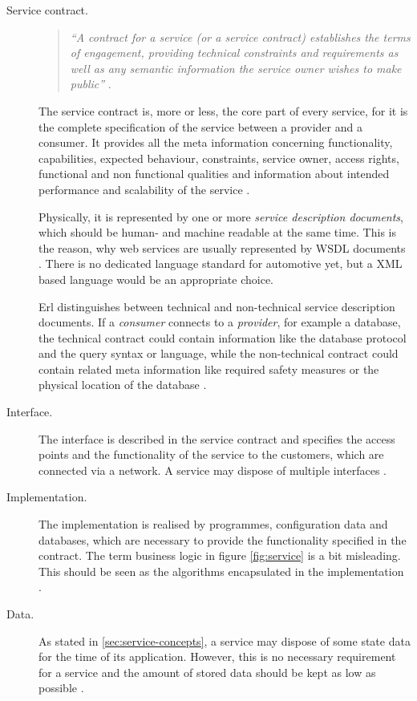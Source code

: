 \begin{description}
\item [Service contract.] 
\begin{quote}
\emph{``A contract for a service (or a service contract) establishes the terms of engagement, providing technical constraints and requirements as well as any semantic information the service owner wishes to make public''} 
\cite[ch.6.1]{erl2008}.
\end{quote}
The service contract is, more or less, the core part of every service, for it is the complete specification of the service between a provider and a consumer. It provides all the meta information concerning functionality, capabilities, expected behaviour, constraints, service owner, access rights, functional and non functional qualities and information about intended performance and scalability of the service \cite[p.44]{krafzig} \cite[p.26]{josuttis} \cite{breivold}.

Physically, it is represented by one or more \emph{service description documents}, which should be human- and machine readable at the same time. This is the reason, why web services are usually represented by WSDL documents \cite[p.43]{erl2011}. There is no dedicated language standard for automotive yet, but a XML based language would be an appropriate choice.

Erl \cite{erl2008} distinguishes between technical and non-technical service description documents. If a \emph{consumer} connects to a \emph{provider}, for example a database, the technical contract could contain information like the database protocol and the query syntax or language, while the non-technical contract could contain related meta information like required safety measures or the physical location of the database \cite[ch.6.1]{erl2008}.

\item [Interface.] 
The interface is described in the service contract and specifies the access points and the functionality of the service to the customers, which are connected via a network. A service may dispose of multiple interfaces \cite[p.44]{krafzig} \cite{breivold}.

\item [Implementation.] 
The implementation is realised by programmes, configuration data and databases, which are necessary to provide the functionality specified in the contract. The term business logic in figure \ref{fig:service} is a bit misleading. This should be seen as the algorithms encapsulated in the implementation \cite[p.44]{krafzig}.

\item [Data.]
As stated in \ref{sec:service-concepts}, a service may dispose of some state data for the time of its application. However, this is no necessary requirement for a service and the amount of stored data should be kept as low as possible \cite[p.44]{krafzig}.
\end{description}

